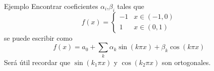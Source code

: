 \documentclass[12pt,aspectratio=169,xcolor=dvipsnames]{beamer}
\begin{document}
\begin{frame}{Ejemplo}
    Encontrar coeficientes $\alpha_i$,$\beta_i$ tales que
        $$ f(x) = \begin{cases} -1 & x \in (-1,0) \\ 1 & x \in (0,1) \end{cases} $$
    se puede escribir como
        $$ f(x) = a_0 + \sum_k \alpha_k \sin(k\pi x) + \beta_k\cos(k\pi x) $$
    Será útil recordar que $\sin(k_1\pi x)$ y $\cos(k_2\pi x)$ son ortogonales.
\end{frame}
\begin{frame}
    \maketitle
\end{frame}
\end{document}
